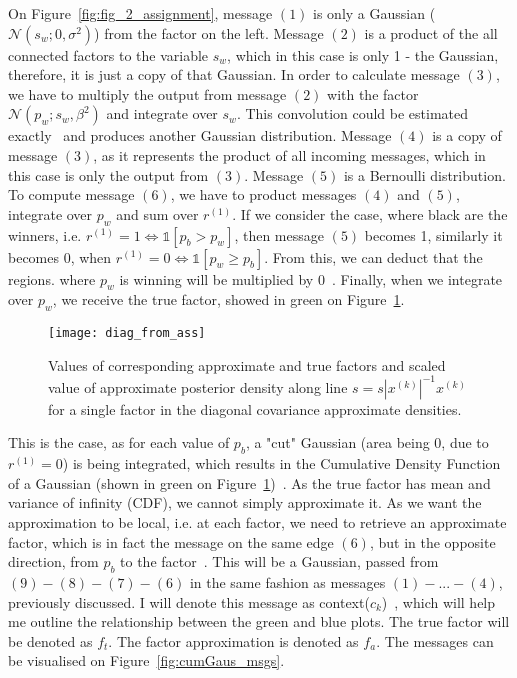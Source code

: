 \documentclass[a4paper,11pt]{article}
\theoremstyle{mytheor}
\begin{document}
On Figure~\ref{fig:fig_2_assignment}, message $(1)$ is only a Gaussian ($\mathcal{N}(s_w;0,\sigma^2)$) from the factor on the left. Message $(2)$ is a product of the all connected factors to the variable $s_w$, which in this case is only 1 - the Gaussian, therefore, it is just a copy of that Gaussian. In order to calculate message $(3)$, we have to multiply the output from message $(2)$ with the factor $\mathcal{N}(p_w;s_w,\beta^2)$ and integrate over $s_w$. This convolution could be estimated exactly~\cite[Equation 2.115]{bishop2006pattern} and produces another Gaussian distribution. Message $(4)$ is a copy of message $(3)$, as it represents the product of all incoming messages, which in this case is only the output from $(3)$. Message $(5)$ is a Bernoulli distribution. To compute message $(6)$, we have to product messages $(4)$ and $(5)$, integrate over $p_w$ and sum over $r^{(1)}$. If we consider the case, where black are the winners, i.e. $r^{(1)}=1 \Leftrightarrow \mathbb{1}[p_b > p_w]$, then message $(5)$ becomes 1, similarly it becomes 0, when $r^{(1)}=0 \Leftrightarrow \mathbb{1}[p_w \geq p_b]$. From this, we can deduct that the regions. where $p_w$ is winning will be multiplied by 0~\cite{bishop2013model}. Finally, when we integrate over $p_w$, we receive the true factor, showed in green on Figure~\ref{fig:diag_from_orig}.

\begin{figure}[htpb!]
    \centering
    \texttt{[image: diag\_from\_ass]}
    \caption{Values of corresponding approximate and true factors and scaled value of approximate posterior density along line $s=s|x^{(k)}|^{-1}x^{(k)}$ for a single factor in the diagonal covariance approximate densities.}
    \label{fig:diag_from_orig}
\end{figure}

This is the case, as for each value of $p_b$, a "cut" Gaussian (area being 0, due to $r^{(1)}=0$) is being integrated, which results in the Cumulative Density Function of a Gaussian (shown in green on Figure~\ref{fig:diag_from_orig})~\cite{bishop2013model}. As the true factor has mean and variance of infinity (CDF), we cannot simply approximate it. As we want the approximation to be local, i.e. at each factor, we need to retrieve an approximate factor, which is in fact the message on the same edge $(6)$, but in the opposite direction, from $p_b$ to the factor~\cite{bishop2013model}. This will be a Gaussian, passed from $(9)-(8)-(7)-(6)$ in the same fashion as messages $(1)-...-(4)$, previously discussed. I will denote this message as context($c_k$)~\cite{bishop2013model}, which will help me outline the relationship between the green and blue plots. The true factor will be denoted as $f_t$. The factor approximation is denoted as $f_a$. The messages can be visualised on Figure~\ref{fig:cumGaus_msgs}.
\end{document}
